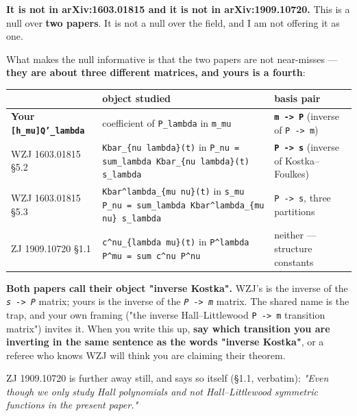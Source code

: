 \documentclass[11pt,a4paper]{article}
\begin{document}
\textbf{It is not in arXiv:1603.01815 and it is not in arXiv:1909.10720.} This is a null over \textbf{two papers}. It is not a null over the field, and I am not offering it as one.

What makes the null informative is that the two papers are not near-misses --- \textbf{they are about three different matrices, and yours is a fourth}:

\begin{center}\footnotesize
\begin{tabular}{@{}p{}p{}p{}@{}}
\hline
\textbf{} & \textbf{object studied} & \textbf{basis pair}\\ \hline
\textbf{Your \mbox{\texttt{[h\_mu]Q'\_lambda}}} & coefficient of \mbox{\texttt{P\_lambda}} in \mbox{\texttt{m\_mu}} & \textbf{\mbox{\texttt{m -> P}}} (inverse of \mbox{\texttt{P -> m}})\\
WZJ 1603.01815 §5.2 & \mbox{\texttt{Kbar\_\{nu lambda\}(t)}} in \mbox{\texttt{P\_nu = sum\_lambda Kbar\_\{nu lambda\}(t) s\_lambda}} & \textbf{\mbox{\texttt{P -> s}}} (inverse of Kostka--Foulkes)\\
WZJ 1603.01815 §5.3 & \mbox{\texttt{Kbar\textasciicircum{}lambda\_\{mu nu\}(t)}} in \mbox{\texttt{s\_mu P\_nu = sum\_lambda Kbar\textasciicircum{}lambda\_\{mu nu\} s\_lambda}} & \mbox{\texttt{P -> s}}, three partitions\\
ZJ 1909.10720 §1.1 & \mbox{\texttt{c\textasciicircum{}nu\_\{lambda mu\}(t)}} in \mbox{\texttt{P\textasciicircum{}lambda P\textasciicircum{}mu = sum c\textasciicircum{}nu P\textasciicircum{}nu}} & neither --- structure constants\\
\hline\end{tabular}\end{center}

\textbf{Both papers call their object "inverse Kostka".} WZJ's is the inverse of the \emph{\mbox{\texttt{s -> P}}} matrix; yours is the inverse of the \emph{\mbox{\texttt{P -> m}}} matrix. The shared name is the trap, and your own framing ("the inverse Hall--Littlewood \mbox{\texttt{P -> m}} transition matrix") invites it. When you write this up, \textbf{say which transition you are inverting in the same sentence as the words "inverse Kostka"}, or a referee who knows WZJ will think you are claiming their theorem.

ZJ 1909.10720 is further away still, and says so itself (§1.1, verbatim): \emph{"Even though we only study Hall polynomials and not Hall--Littlewood symmetric functions in the present paper."}
\end{document}
